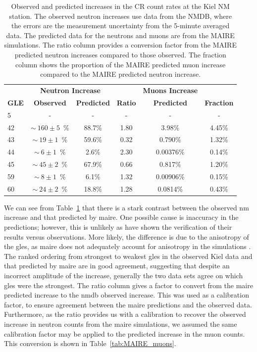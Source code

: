 \begin{table}[ht!]
	\begin{center}
		\caption{Observed and predicted increases in the CR count rates at the Kiel NM station. The observed neutron increases use data from the NMDB, where the errors are the measurement uncertainty from the 5-minute averaged data. The predicted data for the neutrons and muons are from the MAIRE simulations. The ratio column provides a conversion factor from the MAIRE predicted neutron increases compared to those observed. The fraction column shows the proportion of the MAIRE predicted muon increase compared to the MAIRE predicted neutron increase.}
		\label{tab:KIEL_GLEs}
		\begin{tabular}{l c c c | c c}
			\hline
			&  \multicolumn{2}{c}{\bf Neutron Increase} & & {\bf Muons Increase} & \\
			{\bf GLE} & {\bf Observed} & {\bf Predicted} & {\bf Ratio} & {\bf Predicted} & {\bf Fraction}\\ 
			\hline
			5 & - & - & - & - & - \\
			42 & $\sim~160\pm5$~\% & 88.7\% & 1.80 & 3.98\% & 4.45\% \\
			43 & $\sim~19\pm1$~\% & 59.6\% & 0.32 & 0.790\% & 1.32\% \\
			44  & $\sim~6\pm1$~\% & 2.6\% & 2.30 & 0.00376\% & 0.14\% \\
			45  & $\sim~45\pm2$~\% & 67.9\% & 0.66 & 0.817\% & 1.20\% \\
			59 & $\sim~8\pm1$~\% & 6.1\% & 1.32 & 0.00906\% & 0.15\% \\
			60 & $\sim~24\pm2$~\% & 18.8\% & 1.28 & 0.0814\% & 0.43\% \\
			\hline
		\end{tabular}
	\end{center}
\end{table}

We can see from Table~\ref{tab:KIEL_GLEs} that there is a stark contrast between the observed \gls{nm} increase and that predicted by \gls{maire}. One possible cause is inaccuracy in the predictions; however, this is unlikely as \citet{lei_atmospheric_2004} have shown the verification of their results versus observations. More likely, the difference is due to the anisotropy of the \glspl{gle}, as \gls{maire} does not adequately account for anisotropy in the simulations \citep{dyer_calculations_2003, lei_atmospheric_2004}. The ranked ordering from strongest to weakest \glspl{gle} in the observed Kiel data and that predicted by \gls{maire} are in good agreement, suggesting that despite an incorrect amplitude of the increase, generally the two data sets agree on which \glspl{gle} were the strongest. The ratio column gives a factor to convert from the \gls{maire} predicted increase to the \gls{nmdb} observed increase. This was used as a calibration factor, to ensure agreement between the \gls{maire} predictions and the observed data. Furthermore, as the ratio provides us with a calibration to recover the observed increase in neutron counts from the \gls{maire} simulations, we assumed the same calibration factor may be applied to the predicted increase in the muon counts. This conversion is shown in Table~\ref{tab:MAIRE_muons}. 

